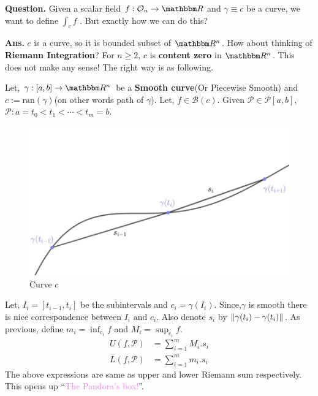 \documentclass[../Analysis-3]{subfiles}
\begin{document}
\textbf{Question.} Given a scalar field $f : \Op{n} \to \R$ and $\gamma \equiv c$ be a curve, we want to define $\int_c f$ . But exactly how we can do this?

\textbf{Ans.} $c$ is a curve, so it is bounded subset of $\R^n$. How about thinking of \textbf{Riemann Integration}? For $n \ge 2$, $c$ is \textbf{content zero} in $\R^n$. This does not make any sense! The right way is as following.

\vspace*{0.5cm}

Let, $\gamma :[a,b]\to \R^n$ be a \textbf{Smooth curve}(Or Piecewise Smooth) and $c:= \text{ran}(\gamma)$(on other words path of $\gamma$). Let, $f \in \mathscr{B}(c)$. Given $\mathcal{P} \in \mathscr{P}[a,b]$, $\mathcal{P} : a = t_0<t_1<\cdots <t_m = b$.

\vspace{0.2cm}

\begin{figure}
    \centering
    \includegraphics[width=.98\linewidth]{../figures/lec-23.1.png}
    \caption{Curve $c$}
\end{figure}
Let, $I_i = [t_{i-1},t_i]$ be the subintervals and $c_i = \gamma(I_i)$.
Since,$\gamma$ is smooth there is nice correspondence between $I_i$ and $c_i$. Also denote $s_i$ by $\norm{\gamma(t_i) - \gamma(t_i)}$. As previous, define $m_i = \inf_{c_i}f$ and $M_i = \sup_{c_i}f$.
\begin{align*}
    U(f,\mathcal{P}) & = \sum_{i=1}^{m}M_i.s_i \\
    L(f,\mathcal{P}) & = \sum_{i=1}^{m}m_i.s_i
\end{align*}
The above expressions are same as upper and
\vspace{0.05cm}
lower Riemann sum respectively. This opens up ``\textcolor{violet}{The Pandora's box!}''.
\vspace{0.3cm}
\end{document}
